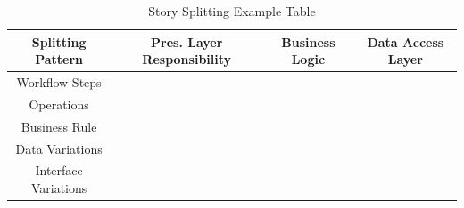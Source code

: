 \documentclass[../Main.tex]{subfiles}
\begin{document}
\begin{table}
    \centering
    \begin{tabular}{|c|c|c|c|} \hline 
        Splitting Pattern&  Pres. Layer Responsibility &  Business Logic& Data Access Layer\\ \hline 
        Workflow Steps&  &  & \\ \hline 
        Operations&  &  & \\ \hline 
        Business Rule&  &  & \\ \hline 
        Data Variations&  &  & \\ \hline 
        Interface Variations& & &\\ \hline
    \end{tabular}
    \caption{Story Splitting Example Table}
    \label{tab:storysplitex}
\end{table}
\end{document}
